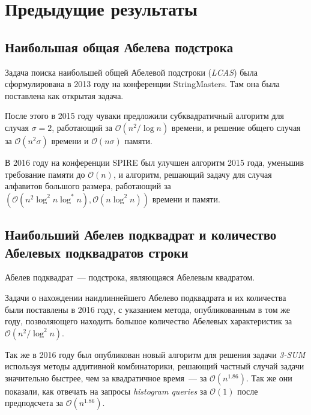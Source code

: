\section{Предыдущие результаты}
\subsection{Наибольшая общая Абелева подстрока}
Задача поиска наибольшей общей Абелевой подстроки (\textit{LCAS}) была сформулирована в 2013 году на конференции StringMasters. Там она была поставлена как открытая задача.

После этого в 2015 году чуваки предложили субквадратичный алгоритм для случая $\sigma=2$, работающий за $\mathcal{O}(n^2/\log n)$ времени, и решение общего случая за $\mathcal{O}(n^2\sigma)$ времени и $\mathcal{O}(n\sigma)$ памяти.

В 2016 году на конференции SPIRE \cite{1} был улучшен алгоритм 2015 года, уменьшив требование памяти до $\mathcal{O}(n)$, и алгоритм, решающий задачу для случая алфавитов большого размера, работающий за $(\mathcal{O}(n^2 \log^2 n \log^* n), \mathcal{O}(n \log^2 n))$ времени и памяти.

\subsection{Наибольший Абелев подквадрат и количество Абелевых подквадратов строки}
Абелев подквадрат~--- подстрока, являющаяся Абелевым квадратом.

Задачи о нахождении наидлиннейшего Абелево подквадрата и их количества были поставлены в 2016 году, с указанием метода, опубликованным в том же году, позволяющего находить большое количество Абелевых характеристик за $\mathcal{O}(n^2 / \log^2 n)$.

Так же в 2016 году был опубликован новый алгоритм для решения задачи \textit{3-SUM} используя методы аддитивной комбинаторики, решающий частный случай задачи значительно быстрее, чем за квадратичное время~--- за $\mathcal{O}(n^{1.86})$. Так же они показали, как отвечать на запросы \textit{histogram queries} за $\mathcal{O}(1)$ после предподсчета за $\mathcal{O}(n^{1.86})$.